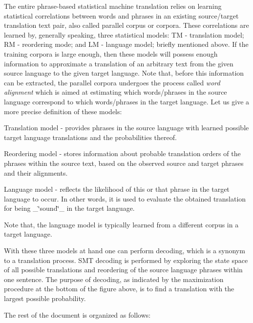The entire phrase-\/based statistical machine translation relies on learning statistical correlations between words and phrases in an existing source/target translation text pair, also called parallel corpus or corpora. These correlations are learned by, generally speaking, three statistical models\+: T\+M -\/ translation model; R\+M -\/ reordering mode; and L\+M -\/ language model; briefly mentioned above. If the training corpora is large enough, then these models will possess enough information to approximate a translation of an arbitrary text from the given source language to the given target language. Note that, before this information can be extracted, the parallel corpora undergoes the process called {\itshape word alignment} which is aimed at estimating which words/phrases in the source language correspond to which words/phrases in the target language. Let us give a more precise definition of these models\+:


\begin{DoxyEnumerate}
\item Translation model -\/ provides phrases in the source language with learned possible target language translations and the probabilities thereof.
\item Reordering model -\/ stores information about probable translation orders of the phrases within the source text, based on the observed source and target phrases and their alignments.
\item Language model -\/ reflects the likelihood of this or that phrase in the target language to occur. In other words, it is used to evaluate the obtained translation for being \+\_\+\char`\"{}sound\char`\"{}\+\_\+ in the target language.
\end{DoxyEnumerate}

Note that, the language model is typically learned from a different corpus in a target language.

With these three models at hand one can perform decoding, which is a synonym to a translation process. S\+M\+T decoding is performed by exploring the state space of all possible translations and reordering of the source language phrases within one sentence. The purpose of decoding, as indicated by the maximization procedure at the bottom of the figure above, is to find a translation with the largest possible probability.

The rest of the document is organized as follows\+:


